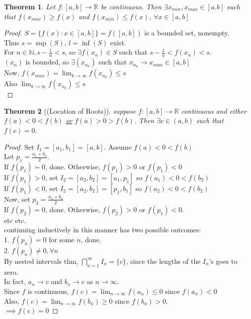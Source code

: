\documentclass{report}
\newcommand{\N}{\mathbb{N}}  %
\newcommand{\R}{\mathbb{R}}  %
\newcommand{\xn}{(x_n)}
\newcommand{\xnkp}{(x_{n_k})}
\newcommand{\xnk}{x_{n_k}}
\theoremstyle{mystyle}
\newtheorem*{theorem}{Theorem}
\theoremstyle{customtheorem}
\begin{document}
    \begin{theorem}
        Let $f:[a,b]\to \R$ be continuous. Then $\exists x_{min}, x_{max} \in [a.b]$ such that $f(x_{max})\geq f(x)$ and $f(x_{min})\leq f(x)$, $\forall x\in[a,b]$
    \end{theorem}\vspace{-1.25em}
    \begin{proof}
        $S=\{f(x):x\in[a,b]\}=f([a,b])$ is a bounded set, nonempty.\\
        Thus $s=\sup(S)$, $l=\inf(S)$ exist. \\
        For $n\in \N, s-\frac{1}{n}<s$, so $\exists f(x_n)\in S$ such that $s-\frac{1}{n}<f(x_n)<s$.\\
        $\xn$ is bounded, so $\exists\xnkp$ such that $\xnk \to x_{max}\in[a,b]$\\
        Now, $f(x_{max})=\lim_{k\to\infty}f\xnkp\leq s$\\
        Also $\lim_{k\to\infty}f\xnkp\leq s$ \\
    \end{proof}

    \begin{theorem}[(Location of Roots)]
        suppose $f:[a,b]\to\R$ continuous and either $f(a)<0<f(b)$ \ul{or} $f(a)>0>f(b)$.
        Then $\exists c\in(a,b)$ such that $f(c)=0$.
    \end{theorem}
    \begin{proof}
        Set $I_1=[a_1,b_1]=[a,b]$. Assume $f(a)<0<f(b)$ \\
        Let $p_1=\frac{a_1+b_1}{2}$. \\
        If $f(p_1)=0$, done. Otherwise, $f(p_1) > 0$ or $f(p_1) < 0$\\
        If $f(p_1) > 0$, set $I_2=[a_2,b_2]=[a_1,p_1]$ so $f(a_1)<0<f(b_2)$ \\
        If $f(p_1) < 0$, set $I_2=[a_2,b_2]=[p_1,b_1]$ so $f(a_2)<0<f(b_2)$ \\
        Now, set $p_2=\frac{a_2+b_2}{2}$\\
        If $f(p_2)=0$, done. Otherwise, $f(p_2) > 0$ or $f(p_1) < 0$.\\
        etc etc. \\
        continuing inductively in this manner has two possible outcomes:\\
        1. $f(p_n)=0$ for some $n$, done.\\
        2. $f(p_n)\neq 0, \forall n$\\
        By nested intervals thm, $\bigcap_{n=1}^{\infty}I_n=\{c\}$, since the lengths of the $I_n$'s goes to zero. \\
        In fact, $a_n\to c$ and $b_n\to c$ as $n\to\infty$. \\
        Since $f$ is continuous, $f(c)=\lim_{n\to \infty}f(a_n)\leq 0$ since $f(a_n)<0$\\
        Also, $f(c)=\lim_{n\to \infty}f(b_n)\geq 0$ since $f(b_n)>0$. \\
        $\implies f(c)=0$
    \end{proof}
\end{document}

